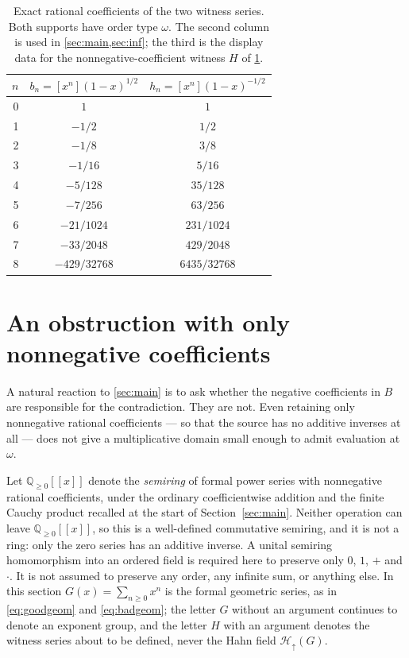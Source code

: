 \documentclass[11pt,letterpaper]{article}
\theoremstyle{definition}
\theoremstyle{remark}
\newcommand{\Q}{\mathbb Q}
\newcommand{\Hu}[1]{\mathcal H_{\uparrow}(#1)}
\newcommand{\coeff}[2]{[#1^{#2}]}
\newcommand{\Qnn}{\Q_{\ge0}}
\begin{document}
\begin{table}[htbp]
\centering
\renewcommand{\arraystretch}{1.18}
\begin{tabular}{rcc}
\toprule
$n$ & $b_n=\coeff{x}{n}(1-x)^{1/2}$ & $h_n=\coeff{x}{n}(1-x)^{-1/2}$\\
\midrule
0 & $1$ & $1$\\
1 & $-1/2$ & $1/2$\\
2 & $-1/8$ & $3/8$\\
3 & $-1/16$ & $5/16$\\
4 & $-5/128$ & $35/128$\\
5 & $-7/256$ & $63/256$\\
6 & $-21/1024$ & $231/1024$\\
7 & $-33/2048$ & $429/2048$\\
8 & $-429/32768$ & $6435/32768$\\
\bottomrule
\end{tabular}
\caption{Exact rational coefficients of the two witness series. Both supports
have order type $\omega$. The second column is used in
\cref{sec:main,sec:inf}; the third is the display data for the
nonnegative-coefficient witness $H$ of \cref{sec:semiring}.}
\label{tab:coefficients}
\end{table}

\section{An obstruction with only nonnegative coefficients}\label{sec:semiring}
A natural reaction to \cref{sec:main} is to ask whether the negative
coefficients in $B$ are responsible for the contradiction. They are not.
Even retaining only nonnegative rational coefficients --- so that the source
has no additive inverses at all --- does not give a multiplicative domain
small enough to admit evaluation at $\omega$.

Let $\Qnn[[x]]$ denote the \emph{semiring} of formal power series with
nonnegative rational coefficients, under the ordinary coefficientwise addition
and the finite Cauchy product recalled at the start of
Section~\ref{sec:main}. Neither operation can leave $\Qnn[[x]]$, so this is a
well-defined commutative semiring, and it is not a ring: only the zero series
has an additive inverse. A unital semiring
homomorphism into an ordered field is required here to preserve only
$0$, $1$, $+$ and $\cdot$. It is not assumed to preserve any order, any
infinite sum, or anything else. In this section $G(x)=\sum_{n\ge0}x^n$ is the
formal geometric series, as in \eqref{eq:goodgeom} and \eqref{eq:badgeom}; the
letter $G$ without an argument continues to denote an exponent group, and the
letter $H$ with an argument denotes the witness series about to be defined,
never the Hahn field $\Hu{G}$.
\end{document}
